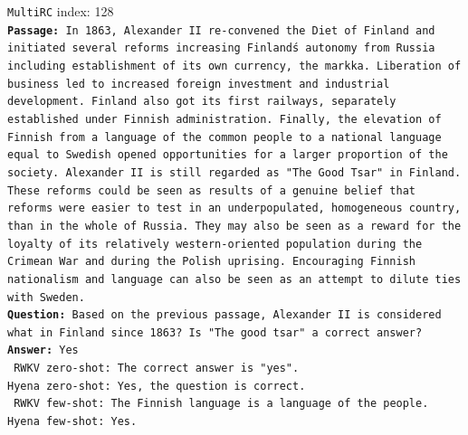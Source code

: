 \begin{tcolorbox}
    {\tt MultiRC} index: 128 \\ 
    
    \small {\tt \textbf{Passage:} In 1863, Alexander II re-convened the Diet of Finland and initiated several reforms increasing Finland\'s autonomy from Russia including establishment of its own currency, the markka. Liberation of business led to increased foreign investment and industrial development. Finland also got its first railways, separately established under Finnish administration. Finally, the elevation of Finnish from a language of the common people to a national language equal to Swedish opened opportunities for a larger proportion of the society. Alexander II is still regarded as "The Good Tsar" in Finland. These reforms could be seen as results of a genuine belief that reforms were easier to test in an underpopulated, homogeneous country, than in the whole of Russia. They may also be seen as a reward for the loyalty of its relatively western-oriented population during the Crimean War and during the Polish uprising. Encouraging Finnish nationalism and language can also be seen as an attempt to dilute ties with Sweden.} \\ 
    
    {\tt \textbf{Question:} Based on the previous passage, Alexander II is considered what in Finland since 1863? Is "The good tsar" a correct answer?} \\

    {\tt \textbf{Answer:} Yes} \\ 

    {\tt {\color{red!80} RWKV zero-shot}: The correct answer is "yes".}  \\ 

    {\tt {\color{blue!80}Hyena zero-shot}: Yes, the question is correct.}  \\

    {\tt {\color{red!80} RWKV few-shot}: The Finnish language is a language of the people.} \\

    {\tt {\color{blue!80}Hyena few-shot}: Yes.} 
\end{tcolorbox}


